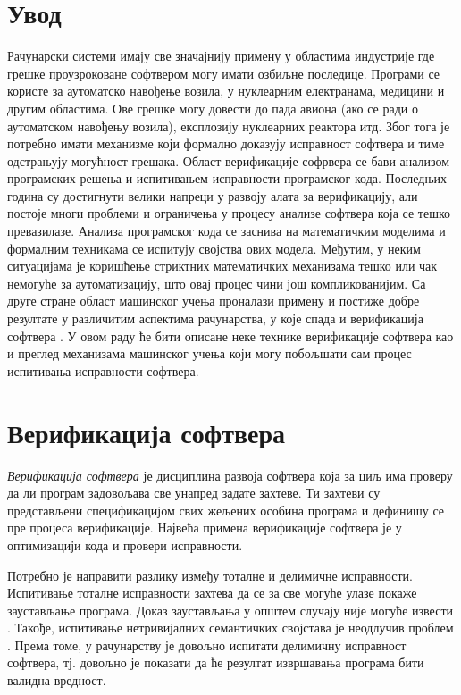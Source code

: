\documentclass[a4paper]{article}
\begin{document}
{\section{Увод}
Рачунарски системи имају све значајнију примену у областима индустрије где грешке проузроковане софтвером могу имати озбиљне последице. Програми се користе за аутоматско навођење возила, у нуклеарним електранама, медицини и другим областима. Ове грешке могу довести до пада авиона (ако се ради о аутоматском навођењу возила), експлозију нуклеарних реактора итд. Због тога је потребно имати механизме који формално доказују исправност софтвера и тиме одстрањују могућност грешака. Област верификације софрвера се бави анализом програмских решења и испитивањем исправности програмског кода. Последњих година су достигнути велики напреци у развоју алата за верификацију, али постоје многи проблеми и ограничења у процесу анализе софтвера која се тешко превазилазе. Анализа програмског кода се заснива на математичким моделима и формалним техникама се испитују својства ових модела. Међутим, у неким ситуацијама је коришћење стриктних математичких механизама тешко или чак немогуће за аутоматизацију, што овај процес чини још компликованијим. Са друге стране област машинског учења проналази примену и постиже добре резултате у различитим аспектима рачунарства, у које спада и верификација софтвера \cite{new-cv, old-cv}.  У овом раду ће бити описане неке технике верификације софтвера као и преглед механизама машинског учења који могу побољшати сам процес испитивања исправности софтвера.
\section{Верификација софтвера}

\emph{Верификација софтвера} је дисциплина развоја софтвера која за циљ има проверу да ли програм задовољава све унапред задате захтеве. Ти захтеви су представљени спецификацијом свих жељених особина програма и дефинишу се пре процеса верификације. Највећа примена верификације софтвера је у оптимизацији кода и провери исправности.


Потребно је направити разлику између тоталне и делимичне исправности. Испитивање тоталне исправности захтева да се за све могуће улазе покаже заустављање програма. Доказ заустављања у општем случају није могуће извести \cite{turing}. Такође, испитивање нетривијалних семантичких својстава је неодлучив проблем \cite{rice}.
Према томе, у рачунарству је довољно испитати делимичну исправност софтвера, тј. довољно је показати да ће резултат извршавања програма бити валидна вредност.


}
\end{document}
